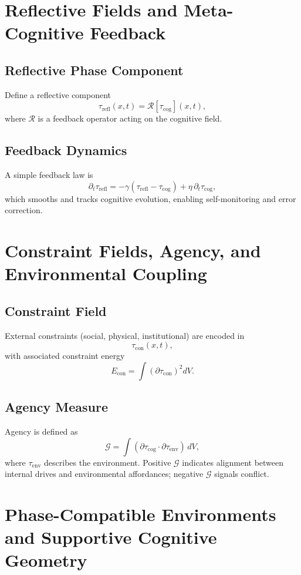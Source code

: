 \chapter{Reflective Fields and Meta-Cognitive Feedback}

\section{Reflective Phase Component}
Define a reflective component
\[
\tau_{\mathrm{refl}}(x,t) = \mathcal{R}[\tau_{\mathrm{cog}}](x,t),
\]
where \(\mathcal{R}\) is a feedback operator acting on the cognitive field.

\section{Feedback Dynamics}
A simple feedback law is
\[
\partial_t \tau_{\mathrm{refl}} = -\gamma\left(\tau_{\mathrm{refl}} - \tau_{\mathrm{cog}}\right) + \eta\,\partial_t \tau_{\mathrm{cog}},
\]
which smooths and tracks cognitive evolution, enabling self-monitoring and error correction.

\chapter{Constraint Fields, Agency, and Environmental Coupling}

\section{Constraint Field}
External constraints (social, physical, institutional) are encoded in
\[
\tau_{\mathrm{con}}(x,t),
\]
with associated constraint energy
\[
E_{\mathrm{con}} = \int (\partial\tau_{\mathrm{con}})^2 dV.
\]

\section{Agency Measure}
Agency is defined as
\[
\mathcal{G} = \int (\partial\tau_{\mathrm{cog}}\cdot \partial\tau_{\mathrm{env}})\, dV,
\]
where \(\tau_{\mathrm{env}}\) describes the environment.
Positive \(\mathcal{G}\) indicates alignment between internal drives and environmental affordances; negative \(\mathcal{G}\) signals conflict.

\chapter{Phase-Compatible Environments and Supportive Cognitive Geometry}

